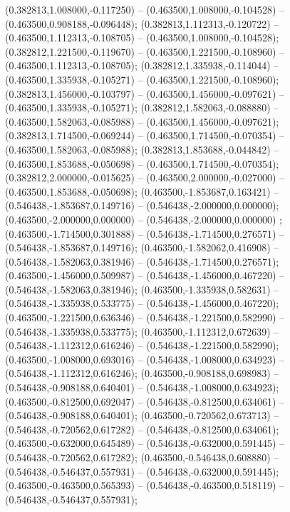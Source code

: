  (0.382813,1.008000,-0.117250) -- (0.463500,1.008000,-0.104528) -- (0.463500,0.908188,-0.096448);
 (0.382813,1.112313,-0.120722) -- (0.463500,1.112313,-0.108705) -- (0.463500,1.008000,-0.104528);
 (0.382812,1.221500,-0.119670) -- (0.463500,1.221500,-0.108960) -- (0.463500,1.112313,-0.108705);
 (0.382812,1.335938,-0.114044) -- (0.463500,1.335938,-0.105271) -- (0.463500,1.221500,-0.108960);
 (0.382813,1.456000,-0.103797) -- (0.463500,1.456000,-0.097621) -- (0.463500,1.335938,-0.105271);
 (0.382812,1.582063,-0.088880) -- (0.463500,1.582063,-0.085988) -- (0.463500,1.456000,-0.097621);
 (0.382813,1.714500,-0.069244) -- (0.463500,1.714500,-0.070354) -- (0.463500,1.582063,-0.085988);
 (0.382813,1.853688,-0.044842) -- (0.463500,1.853688,-0.050698) -- (0.463500,1.714500,-0.070354);
 (0.382812,2.000000,-0.015625) -- (0.463500,2.000000,-0.027000) -- (0.463500,1.853688,-0.050698);
 (0.463500,-1.853687,0.163421) -- (0.546438,-1.853687,0.149716) -- (0.546438,-2.000000,0.000000);
 (0.463500,-2.000000,0.000000) -- (0.546438,-2.000000,0.000000) ;
 (0.463500,-1.714500,0.301888) -- (0.546438,-1.714500,0.276571) -- (0.546438,-1.853687,0.149716);
 (0.463500,-1.582062,0.416908) -- (0.546438,-1.582063,0.381946) -- (0.546438,-1.714500,0.276571);
 (0.463500,-1.456000,0.509987) -- (0.546438,-1.456000,0.467220) -- (0.546438,-1.582063,0.381946);
 (0.463500,-1.335938,0.582631) -- (0.546438,-1.335938,0.533775) -- (0.546438,-1.456000,0.467220);
 (0.463500,-1.221500,0.636346) -- (0.546438,-1.221500,0.582990) -- (0.546438,-1.335938,0.533775);
 (0.463500,-1.112312,0.672639) -- (0.546438,-1.112312,0.616246) -- (0.546438,-1.221500,0.582990);
 (0.463500,-1.008000,0.693016) -- (0.546438,-1.008000,0.634923) -- (0.546438,-1.112312,0.616246);
 (0.463500,-0.908188,0.698983) -- (0.546438,-0.908188,0.640401) -- (0.546438,-1.008000,0.634923);
 (0.463500,-0.812500,0.692047) -- (0.546438,-0.812500,0.634061) -- (0.546438,-0.908188,0.640401);
 (0.463500,-0.720562,0.673713) -- (0.546438,-0.720562,0.617282) -- (0.546438,-0.812500,0.634061);
 (0.463500,-0.632000,0.645489) -- (0.546438,-0.632000,0.591445) -- (0.546438,-0.720562,0.617282);
 (0.463500,-0.546438,0.608880) -- (0.546438,-0.546437,0.557931) -- (0.546438,-0.632000,0.591445);
 (0.463500,-0.463500,0.565393) -- (0.546438,-0.463500,0.518119) -- (0.546438,-0.546437,0.557931);
